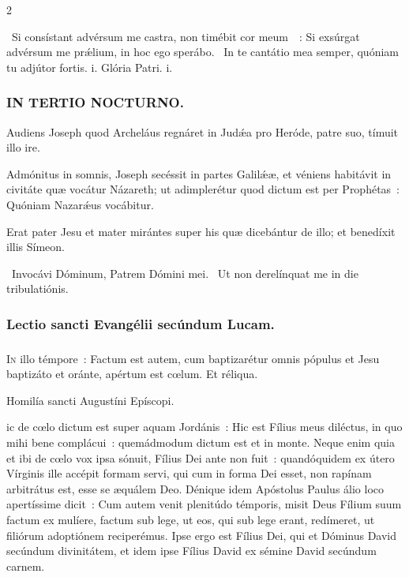 \documentclass[9pt,twoside]{extarticle}
\begin{document}
\begin{multicols}{2}
{{\begin{tightlist}{}
\item {}~Si consístant advérsum me castra, non timébit cor meum~~: \textred{*} Si exsúrgat advérsum me prǽlium, in hoc ego sperábo. ~In te cantátio mea semper, quóniam tu adjútor fortis. i. Glória Patri. i.
\end{tightlist}

\subsubsection*{\center \textsc{IN TERTIO NOCTURNO.}}
\begin{tightlist}{}
\item {} Audiens Joseph quod Archeláus regnáret in Judǽa pro Heróde, patre suo, tímuit illo ire.
\item {} Admónitus in somnis, Joseph secéssit in partes Galilǽæ, et véniens habitávit in civitáte quæ vocátur Názareth; ut adimplerétur quod dictum est per Prophétas~: Quóniam Nazarǽus vocábitur.
\item {} Erat pater Jesu et mater mirántes super his quæ dicebántur de illo; et benedíxit illis Símeon.
\item {}~Invocávi Dóminum, Patrem Dómini mei. ~Ut non derelínquat me in die tribulatiónis.
\end{tightlist}

\subsubsection*{\center Lectio sancti Evangélii secúndum Lucam.}
\subsubsection*{\center {}}
\lettrine{I}n illo témpore~: Factum est autem, cum baptizarétur omnis pópulus et Jesu baptizáto et oránte, apértum est cœlum. Et réliqua.

\begin{center}Homilía sancti Augustíni Epíscopi.\\
\end{center}
ic de cœlo dictum est super aquam Jordánis~: Hic est Fílius meus diléctus, in quo mihi bene complácui~: quemádmodum dictum est et in monte. Neque enim quia et ibi de cœlo vox ipsa sónuit, Fílius Dei ante non fuit~: quandóquidem ex útero Vírginis ille accépit formam servi, qui cum in forma Dei esset, non rapínam arbitrátus est, esse se æquálem Deo. Dénique idem Apóstolus Paulus álio loco apertíssime dicit~: Cum autem venit plenitúdo témporis, misit Deus Fílium suum factum ex mulíere, factum sub lege, ut eos, qui sub lege erant, redímeret, ut filiórum adoptiónem reciperémus. Ipse ergo est Fílius Dei, qui et Dóminus David secúndum divinitátem, et idem ipse Fílius David ex sémine David secúndum carnem.

}}
\end{multicols}
\end{document}
